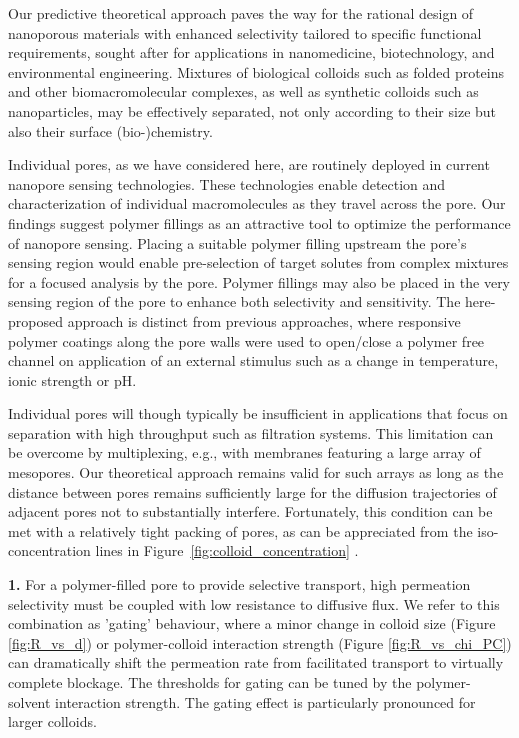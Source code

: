 \documentclass[12pt, a4paper]{article}
\begin{document}
Our predictive theoretical approach paves the way for the rational design of nanoporous materials with enhanced selectivity tailored to specific functional requirements, sought after for applications in nanomedicine, biotechnology, and environmental engineering.
Mixtures of biological colloids such as folded proteins and other biomacromolecular complexes, as well as synthetic colloids such as nanoparticles, may be effectively separated, not only according to their size but also their surface (bio-)chemistry.

Individual pores, as we have considered here, are routinely deployed in current nanopore sensing technologies.
These technologies enable detection and characterization of individual macromolecules as they travel across the pore.
Our findings suggest polymer fillings as an attractive tool to optimize the performance of nanopore sensing.
Placing a suitable polymer filling upstream the pore's sensing region would enable pre-selection of target solutes from complex mixtures for a focused analysis by the pore.
Polymer fillings may also be placed in the very sensing region of the pore to enhance both selectivity and sensitivity.
The here-proposed approach is distinct from previous approaches, where responsive polymer coatings along the pore walls were used to open/close a polymer free channel on application of an external stimulus such as a change in temperature, ionic strength or pH. 

Individual pores will though typically be insufficient in applications that focus on separation with high throughput such as filtration systems.
This limitation can be overcome by multiplexing, e.g., with membranes featuring a large array of mesopores.
Our theoretical approach remains valid for such arrays as long as the distance between pores remains sufficiently large for the diffusion trajectories of adjacent pores not to substantially interfere.
Fortunately, this condition can be met with a relatively tight packing of pores, as can be appreciated from the iso-concentration lines in Figure~\ref{fig:colloid_concentration} \cite{Fabrikant1985}.

\bigskip


\textbf{1.}
For a polymer-filled pore to provide selective transport, high permeation selectivity must be coupled with low resistance to diffusive flux.
We refer to this combination as 'gating' behaviour, where a minor change in colloid size (Figure \ref{fig:R_vs_d}) or polymer-colloid interaction strength (Figure \ref{fig:R_vs_chi_PC}) can dramatically shift the permeation rate from facilitated transport to virtually complete blockage.
The thresholds for gating can be tuned by the polymer-solvent interaction strength.
The gating effect is particularly pronounced for larger colloids.
\end{document}
